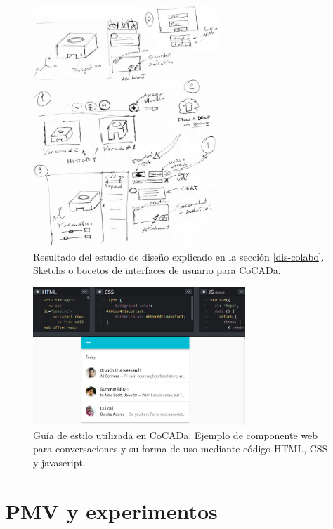 \begin{figure}[ht]
\includegraphics[width=7cm]{Img/UX/edc.jpg}
\centering
\caption{\footnotesize{Resultado del estudio de diseño explicado en la sección \ref{dis-colabo}. Sketchs o bocetos de interfaces de usuario para CoCADa.}}
\label{salida}
\end{figure}

\begin{figure}[ht]
\includegraphics[width=8cm]{Img/Desarrollo/vuety.jpg}
\centering
\caption{\footnotesize{Guía de estilo utilizada en CoCADa. Ejemplo de componente web para conversaciones y su forma de uso mediante código HTML, CSS y javascript.}}
\label{vuetify}
\end{figure}


\clearpage
\section{PMV y experimentos}
\label{pmv-cocada}

